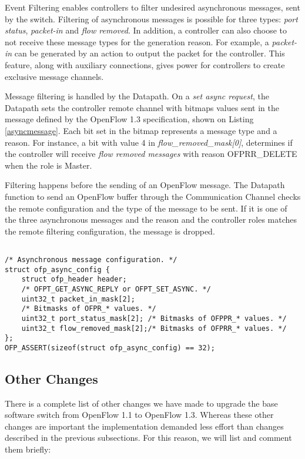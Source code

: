     Event Filtering enables controllers to filter undesired asynchronous messages, sent by the switch. Filtering of asynchronous messages is possible for three types: \textit{port status}, \textit{packet-in} and \textit{flow removed}. In addition, a controller can also choose to not receive these message types for the generation reason. For example, a \textit{packet-in} can be generated by an action to output the packet for the controller. This feature, along with auxiliary connections, gives power for controllers to create exclusive message channels.
    
    Message filtering is handled by the Datapath. On a \textit{set async request}, the Datapath sets the controller remote channel with bitmaps values sent in the message defined by the OpenFlow 1.3 specification, shown on Listing \ref{asyncmessage}. Each bit set in the bitmap represents a message type and a reason. For instance, a bit with value 4 in \textit{flow_removed_mask[0]}, determines if the controller will receive \textit{flow removed messages} with reason OFPRR_DELETE when the role is Master.  
    
    Filtering happens before the sending of an OpenFlow message. The Datapath function to send an OpenFlow buffer through the Communication Channel checks the remote configuration and the type of the message to be sent. If it is one of the three asynchronous messages and the reason and the controller roles matches the remote filtering configuration, the message is dropped. 
    
\begin{lstlisting}[caption={Ethernet parsing in the nbee_link module}, label=asyncmessage,]    

/* Asynchronous message configuration. */
struct ofp_async_config {
    struct ofp_header header;
    /* OFPT_GET_ASYNC_REPLY or OFPT_SET_ASYNC. */
    uint32_t packet_in_mask[2];
    /* Bitmasks of OFPR_* values. */
    uint32_t port_status_mask[2]; /* Bitmasks of OFPPR_* values. */
    uint32_t flow_removed_mask[2];/* Bitmasks of OFPRR_* values. */
};
OFP_ASSERT(sizeof(struct ofp_async_config) == 32);

\end{lstlisting}

\subsection{Other Changes}
\label{sec:sec46}

There is a complete list of other changes we have made to upgrade the base software switch from OpenFlow 1.1 to OpenFlow 1.3. Whereas these other changes are important the implementation demanded less effort than changes described in the previous subsections. For this reason, we will list and comment them briefly:

